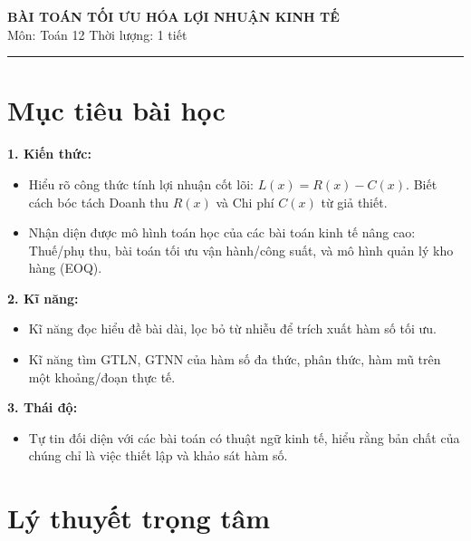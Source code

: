 \documentclass[12pt]{article}
\begin{document}
	
	\begin{center}
		{\LARGE \textbf{BÀI TOÁN TỐI ƯU HÓA LỢI NHUẬN KINH TẾ}}\\[6pt]
		{\large Môn: Toán 12 \quad Thời lượng: 1 tiết}
	\end{center}
	\vspace{4mm}
	\hrule
	\vspace{4mm}
	
	\section*{Mục tiêu bài học}
	
	\textbf{1. Kiến thức:}
	\begin{itemize}
		\item Hiểu rõ công thức tính lợi nhuận cốt lõi: $L(x) = R(x) - C(x)$. Biết cách bóc tách Doanh thu $R(x)$ và Chi phí $C(x)$ từ giả thiết.
		\item Nhận diện được mô hình toán học của các bài toán kinh tế nâng cao: Thuế/phụ thu, bài toán tối ưu vận hành/công suất, và mô hình quản lý kho hàng (EOQ).
	\end{itemize}
	
	\textbf{2. Kĩ năng:}
	\begin{itemize}
		\item Kĩ năng đọc hiểu đề bài dài, lọc bỏ từ nhiễu để trích xuất hàm số tối ưu.
		\item Kĩ năng tìm GTLN, GTNN của hàm số đa thức, phân thức, hàm mũ trên một khoảng/đoạn thực tế.
	\end{itemize}
	
	\textbf{3. Thái độ:}
	\begin{itemize}
		\item Tự tin đối diện với các bài toán có thuật ngữ kinh tế, hiểu rằng bản chất của chúng chỉ là việc thiết lập và khảo sát hàm số.
	\end{itemize}
	
	\newpage
	
	\setcounter{tocdepth}{2}
	\tableofcontents
	\newpage
	
	\section{Lý thuyết trọng tâm}
	
\end{document}
